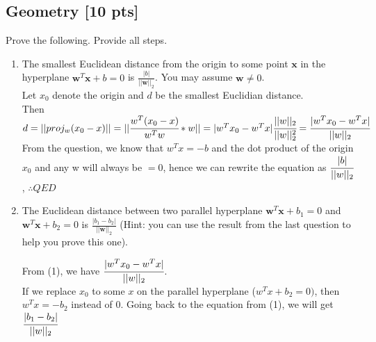 \documentclass[a4paper]{article}
\theoremstyle{definition}
\newenvironment{soln}{
	\leavevmode\color{blue}\ignorespaces
}{}
\begin{document}
	
	
	\subsection{Geometry [10 pts]}
	Prove the following.  Provide all steps.
	\begin{enumerate}
		\item 	The smallest Euclidean distance from the origin to some point $\mathbf{x}$ in the hyperplane $\mathbf{w}^{T}\mathbf{x} + b = 0$ is $\frac{|b|}{||\mathbf{w}||_2}$.  You may assume $\mathbf{w} \neq 0$.\\
		\begin{soln} Let $ x_0 $ denote the origin and $ d $ be the smallest Euclidian distance. \\ Then $ d = ||proj_{w}(x_0 - x)|| = ||\cfrac{w^T(x_{0} - x)}{w^Tw}*w|| = |w^T x_{0} - w^T x| \cfrac{||w||_{2}}{||w||_{2}^{2}} = \cfrac{|w^T x_{0} - w^T x|}{||w||_2}$ \\ From the question, we know that $ w^T x = -b $ and the dot product of the origin $ x_0 $ and any w will always be $ = 0 $, hence we can rewrite the equation as $ \cfrac{|b|}{||w||_{2}}$, $ \therefore QED $ \end{soln}
		
		\item 	The Euclidean distance between two parallel hyperplane $\mathbf{w}^{T}\mathbf{x} + b_1 = 0$ and $\mathbf{w}^{T}\mathbf{x} + b_2 = 0$ is $\frac{|b_1 - b_2|}{||\mathbf{w}||_2}$ (Hint: you can use the result from the last question to help you prove this one).
		
		\begin{soln} From (1), we have $ \cfrac{|w^T x_{0} - w^T x|}{||w||_2} $. \\ If we replace $ x_0 $ to some $x$ on the parallel hyperplane ($w^T x + b_2 = 0) $, then $w^T x = -b_2$ instead of 0. Going back to the equation from (1), we will get $ \cfrac{|b_1 - b_2|}{||w||_2} $ \end{soln}
		
	\end{enumerate}
	
	
	
\end{document}
